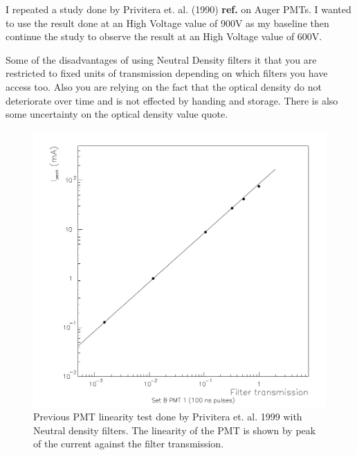 I repeated a study done by Privitera et. al. (1990) \textbf{ref.} on Auger PMTs. I wanted to use the result done at an High Voltage value of 900V as my baseline then continue the study to observe the result at an High Voltage value of 600V.

Some of the disadvantages of using Neutral Density filters it that you are restricted to fixed units of transmission depending on which filters you have access too. Also you are relying on the fact that the optical density do not deteriorate over time and is not effected by handing and storage. There is also some uncertainty on the optical density value quote.

\begin{figure}
\centering
\includegraphics[width=\textwidth]{chapters/graphs/PMTchar/pmt_linearity_100V_privitera.png}
\caption{Previous PMT linearity test done by Privitera et. al. 1999 with Neutral density filters. The linearity of the PMT is shown by peak of the current against the filter transmission. }
\end{figure}

